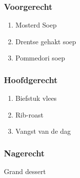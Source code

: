 \subsubsection*{Voorgerecht}
\begin{enumerate}
	\item Mosterd Soep
	\item Drentse gehakt soep
	\item Pommedori soep
\end{enumerate}

\subsubsection*{Hoofdgerecht}
\begin{enumerate}
	\item Biefstuk vlees
	\item Rib-roast
	\item Vangst van de dag
\end{enumerate}

\subsubsection*{Nagerecht}
Grand dessert
